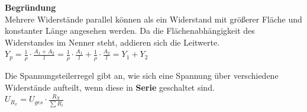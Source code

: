 					          \vspace{1em}

					          \textbf{Begründung} \\
										Mehrere Widerstände parallel können als ein Widerstand mit größerer Fläche und konstanter Länge angesehen werden. Da die Flächenabhängigkeit des Widerstandes im Nenner steht, addieren sich die Leitwerte. \\
											$\displaystyle Y_p = \frac{1}{\rho} \cdot \frac{A_1 + A_2}{l} = \frac{1}{\rho} \cdot \frac{A_1}{l}  + \frac{1}{\rho} \cdot \frac{A_2}{l}  = Y_1 + Y_2 $


										\begin{center}
										\end{center}


										\beginip
										Die Spannungsteilerregel gibt an, wie sich eine Spannung über verschiedene Widerstände aufteilt, wenn diese in \textbf{Serie} geschaltet sind. \\
											\formulaBegin
											$\displaystyle U_{R_x} = U_{ges} \cdot \frac{R_X}{\sum R_i} $
											\formulaEnd

											\begin{center}
											\end{center}
										\iend


